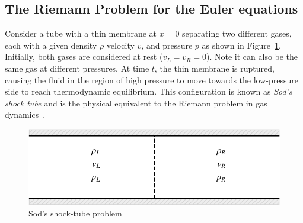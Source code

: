 \subsection{The Riemann Problem for the Euler equations}
Consider a tube with a thin membrane at $x=0$ separating two different gases, each with a given density $\rho$ velocity $v$, and pressure $p$ as shown in Figure~\ref{fig:shocktube}.  Initially, both gases are considered at rest ($v_L=v_R=0$). Note it can also be the same gas at different pressures. At time $t$, the thin membrane is ruptured, causing the fluid in the region of high pressure to move towards the low-pressure side to reach thermodynamic equilibrium. This configuration is known as \textit{Sod's shock tube} and is the physical equivalent to the Riemann problem in gas dynamics~\cite{toroRiemannSolversEvolved2006}.
\begin{figure}[htbp]
	\centering
	\includegraphics[width=0.6\linewidth]{Pictures/sod_shock_tube}
	\caption{Sod's shock-tube problem}
	\label{fig:shocktube}
\end{figure}

